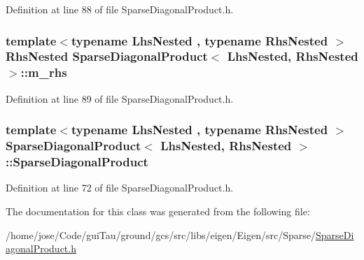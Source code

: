 Definition at line 88 of file Sparse\-Diagonal\-Product.\-h.

\hypertarget{class_sparse_diagonal_product_a4082c64ab2ceca9c10fdf5159051d9fe}{
\subsubsection[{m\-\_\-rhs}]{\setlength{\rightskip}{0pt plus 5cm}template$<$typename Lhs\-Nested , typename Rhs\-Nested $>$ Rhs\-Nested {\bf Sparse\-Diagonal\-Product}$<$ Lhs\-Nested, Rhs\-Nested $>$\-::m\-\_\-rhs\hspace{0.3cm}{\ttfamily [protected]}}}\label{class_sparse_diagonal_product_a4082c64ab2ceca9c10fdf5159051d9fe}


Definition at line 89 of file Sparse\-Diagonal\-Product.\-h.

\hypertarget{class_sparse_diagonal_product_ab407e484e54948f2b4aeb9b22dc53ec3}{
\subsubsection[{Sparse\-Diagonal\-Product}]{\setlength{\rightskip}{0pt plus 5cm}template$<$typename Lhs\-Nested , typename Rhs\-Nested $>$ {\bf Sparse\-Diagonal\-Product}$<$ Lhs\-Nested, Rhs\-Nested $>$\-::{\bf Sparse\-Diagonal\-Product}}}\label{class_sparse_diagonal_product_ab407e484e54948f2b4aeb9b22dc53ec3}


Definition at line 72 of file Sparse\-Diagonal\-Product.\-h.



The documentation for this class was generated from the following file\-:\begin{DoxyCompactItemize}
\item 
/home/jose/\-Code/gui\-Tau/ground/gcs/src/libs/eigen/\-Eigen/src/\-Sparse/\hyperlink{_sparse_diagonal_product_8h}{Sparse\-Diagonal\-Product.\-h}\end{DoxyCompactItemize}
